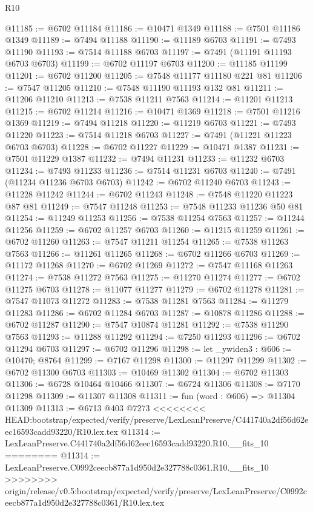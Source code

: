 \begin{lexlean}{R10}
\begin{coremodule}
{{{{{{{{{{{{{{{{{{{{{{{{{{{{{{{{{{{{{{{{{{{{{{{{{{{{{{{{{{{{{{{{{{{{{{{{{{{{{{{{{{{{@11185 := @6702 @11184
@11186 := @10471 @1349
@11188 := @7501 @11186 @1349
@11189 := @7494 @11188
@11190 := @11189 @6703
@11191 := @7493 @11190
@11193 := @7514 @11188 @6703
@11197 := @7491 (@11191 @11193 @6703 @6703)
@11199 := @6702 @11197 @6703
@11200 := @11185 @11199
@11201 := @6702 @11200
@11205 := @7548 @11177 @11180 @221 @81
@11206 := @7547 @11205
@11210 := @7548 @11190 @11193 @132 @81
@11211 := @11206 @11210
@11213 := @7538 @11211 @7563
@11214 := @11201 @11213
@11215 := @6702 @11214
@11216 := @10471 @1369
@11218 := @7501 @11216 @1369
@11219 := @7494 @11218
@11220 := @11219 @6703
@11221 := @7493 @11220
@11223 := @7514 @11218 @6703
@11227 := @7491 (@11221 @11223 @6703 @6703)
@11228 := @6702 @11227
@11229 := @10471 @1387
@11231 := @7501 @11229 @1387
@11232 := @7494 @11231
@11233 := @11232 @6703
@11234 := @7493 @11233
@11236 := @7514 @11231 @6703
@11240 := @7491 (@11234 @11236 @6703 @6703)
@11242 := @6702 @11240 @6703
@11243 := @11228 @11242
@11244 := @6702 @11243
@11248 := @7548 @11220 @11223 @87 @81
@11249 := @7547 @11248
@11253 := @7548 @11233 @11236 @50 @81
@11254 := @11249 @11253
@11256 := @7538 @11254 @7563
@11257 := @11244 @11256
@11259 := @6702 @11257 @6703
@11260 := @11215 @11259
@11261 := @6702 @11260
@11263 := @7547 @11211 @11254
@11265 := @7538 @11263 @7563
@11266 := @11261 @11265
@11268 := @6702 @11266 @6703
@11269 := @11172 @11268
@11270 := @6702 @11269
@11272 := @7547 @11168 @11263
@11274 := @7538 @11272 @7563
@11275 := @11270 @11274
@11277 := @6702 @11275 @6703
@11278 := @11077 @11277
@11279 := @6702 @11278
@11281 := @7547 @11073 @11272
@11283 := @7538 @11281 @7563
@11284 := @11279 @11283
@11286 := @6702 @11284 @6703
@11287 := @10878 @11286
@11288 := @6702 @11287
@11290 := @7547 @10874 @11281
@11292 := @7538 @11290 @7563
@11293 := @11288 @11292
@11294 := @7250 @11293
@11296 := @6702 @11294 @6703
@11297 := @6702 @11296
@11298 := let _ywiden3 : @606 := @10470; @8764
@11299 := @7167 @11298
@11300 := @11297 @11299
@11302 := @6702 @11300 @6703
@11303 := @10469 @11302
@11304 := @6702 @11303
@11306 := @6728 @10464 @10466
@11307 := @6724 @11306
@11308 := @7170 @11298
@11309 := @11307 @11308
@11311 := fun (word : @606) => @11304 @11309
@11313 := @6713 @403 @7273
<<<<<<<< HEAD:bootstrap/expected/verify/preserve/LexLeanPreserve/C441740a2df56d62eec16593cadd93220/R10.lex.tex
@11314 := LexLeanPreserve.C441740a2df56d62eec16593cadd93220.R10.__fits_10
========
@11314 := LexLeanPreserve.C0992ceecb877a1d950d2e327788c0361.R10.__fits_10
>>>>>>>> origin/release/v0.5:bootstrap/expected/verify/preserve/LexLeanPreserve/C0992ceecb877a1d950d2e327788c0361/R10.lex.tex
}}}}}}}}}}}}}}}}}}}}}}}}}}}}}}}}}}}}}}}}}}}}}}}}}}}}}}}}}}}}}}}}}}}}}}}}}}}}}}}}}}}}
\end{coremodule}
\end{lexlean}
